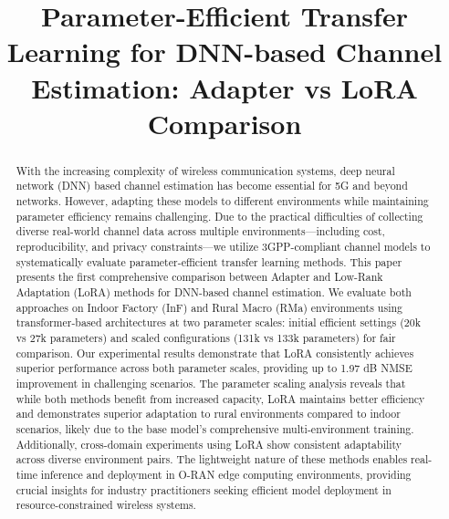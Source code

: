 \documentclass[conference]{IEEEtran}
\begin{document}
\title{Parameter-Efficient Transfer Learning for DNN-based Channel Estimation: Adapter vs LoRA Comparison}

\author{
}

\maketitle

\begin{abstract}
With the increasing complexity of wireless communication systems, deep neural network (DNN) based channel estimation has become essential for 5G and beyond networks. However, adapting these models to different environments while maintaining parameter efficiency remains challenging. Due to the practical difficulties of collecting diverse real-world channel data across multiple environments—including cost, reproducibility, and privacy constraints—we utilize 3GPP-compliant channel models to systematically evaluate parameter-efficient transfer learning methods. This paper presents the first comprehensive comparison between Adapter and Low-Rank Adaptation (LoRA) methods for DNN-based channel estimation. We evaluate both approaches on Indoor Factory (InF) and Rural Macro (RMa) environments using transformer-based architectures at two parameter scales: initial efficient settings (20k vs 27k parameters) and scaled configurations (131k vs 133k parameters) for fair comparison. Our experimental results demonstrate that LoRA consistently achieves superior performance across both parameter scales, providing up to 1.97 dB NMSE improvement in challenging scenarios. The parameter scaling analysis reveals that while both methods benefit from increased capacity, LoRA maintains better efficiency and demonstrates superior adaptation to rural environments compared to indoor scenarios, likely due to the base model's comprehensive multi-environment training. Additionally, cross-domain experiments using LoRA show consistent adaptability across diverse environment pairs. The lightweight nature of these methods enables real-time inference and deployment in O-RAN edge computing environments, providing crucial insights for industry practitioners seeking efficient model deployment in resource-constrained wireless systems.
\end{abstract}
\end{document}

